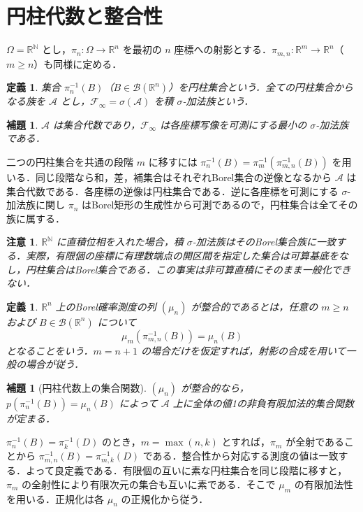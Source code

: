 \documentclass[a5paper,10pt,onecolumn]{jsarticle}
\makeatletter
\theoremstyle{mathnotetheorem}
\newtheorem{definition}[theorem]{定義}
\newtheorem{lemma}[theorem]{補題}
\newtheorem{remark}[theorem]{注意}
\renewcommand{\proofname}{証明}
\renewenvironment{proof}[1][\proofname]{%
  \par\pushQED{\qed}\normalfont\topsep4\p@\@plus2\p@\relax
  \trivlist\item[\hskip\labelsep\bfseries #1]\ignorespaces
}{\popQED\endtrivlist\@endpefalse}
\newcommand{\R}{\mathbb{R}}
\newcommand{\N}{\mathbb{N}}
\newcommand{\F}{\mathcal F}
\newcommand{\B}{\mathcal B}
\newcommand{\1}{\mathbf{1}}
\makeatother
\begin{document}
\section{円柱代数と整合性}
$\Omega=\R^\N$ とし，$\pi_n:\Omega\to\R^n$ を最初の $n$ 座標への射影とする．$\pi_{m,n}:\R^m\to\R^n$（$m\ge n$）も同様に定める．
\begin{definition}
集合 $\pi_n^{-1}(B)$（$B\in\B(\R^n)$）を円柱集合という．全ての円柱集合からなる族を $\mathcal A$ とし，$\F_\infty=\sigma(\mathcal A)$ を積 $\sigma$-加法族という．
\end{definition}
\begin{lemma}\label{cyl}
$\mathcal A$ は集合代数であり，$\F_\infty$ は各座標写像を可測にする最小の $\sigma$-加法族である．
\end{lemma}
\begin{proof}
二つの円柱集合を共通の段階 $m$ に移すには $\pi_n^{-1}(B)=\pi_m^{-1}(\pi_{m,n}^{-1}(B))$ を用いる．同じ段階なら和，差，補集合はそれぞれBorel集合の逆像となるから $\mathcal A$ は集合代数である．各座標の逆像は円柱集合である．逆に各座標を可測にする $\sigma$-加法族に関し $\pi_n$ はBorel矩形の生成性から可測であるので，円柱集合は全てその族に属する．
\end{proof}
\begin{remark}
$\R^\N$ に直積位相を入れた場合，積 $\sigma$-加法族はそのBorel集合族に一致する．実際，有限個の座標に有理数端点の開区間を指定した集合は可算基底をなし，円柱集合はBorel集合である．この事実は非可算直積にそのまま一般化できない．
\end{remark}
\begin{definition}
$\R^n$ 上のBorel確率測度の列 $(\mu_n)$ が整合的であるとは，任意の $m\ge n$ および $B\in\B(\R^n)$ について
\[
 \mu_m(\pi_{m,n}^{-1}(B))=\mu_n(B)
\]
となることをいう．$m=n+1$ の場合だけを仮定すれば，射影の合成を用いて一般の場合が従う．
\end{definition}
\begin{lemma}[円柱代数上の集合関数]\label{content}
$(\mu_n)$ が整合的なら，$p(\pi_n^{-1}(B))=\mu_n(B)$ によって $\mathcal A$ 上に全体の値1の非負有限加法的集合関数が定まる．
\end{lemma}
\begin{proof}
$\pi_n^{-1}(B)=\pi_k^{-1}(D)$ のとき，$m=\max(n,k)$ とすれば，$\pi_m$ が全射であることから $\pi_{m,n}^{-1}(B)=\pi_{m,k}^{-1}(D)$ である．整合性から対応する測度の値は一致する．よって良定義である．有限個の互いに素な円柱集合を同じ段階に移すと，$\pi_m$ の全射性により有限次元の集合も互いに素である．そこで $\mu_m$ の有限加法性を用いる．正規化は各 $\mu_n$ の正規化から従う．
\end{proof}
\end{document}
